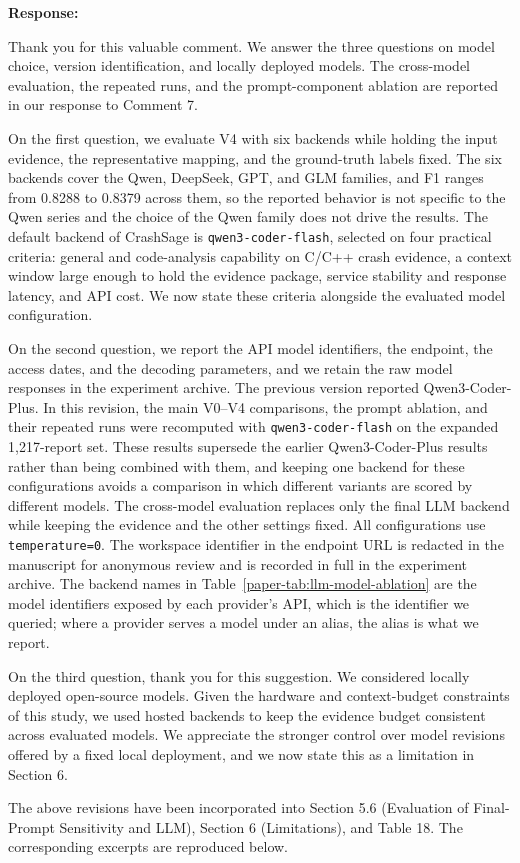 \documentclass[onecolumn,11pt]{article}
\newcommand{\secr}[2]{\par\mySep \noindent \textsf{\textbf{#1 }}{#2}\par}
\newcommand{\mySep}{\vspace{8pt}}
\begin{document}
\secr{Response:}{Thank you for this valuable comment. We answer the three questions on model choice, version identification, and locally deployed models. The cross-model evaluation, the repeated runs, and the prompt-component ablation are reported in our response to Comment 7.

On the first question, we evaluate V4 with six backends while holding the input evidence, the representative mapping, and the ground-truth labels fixed. The six backends cover the Qwen, DeepSeek, GPT, and GLM families, and F1 ranges from 0.8288 to 0.8379 across them, so the reported behavior is not specific to the Qwen series and the choice of the Qwen family does not drive the results. The default backend of CrashSage is \texttt{qwen3-coder-flash}, selected on four practical criteria: general and code-analysis capability on C/C++ crash evidence, a context window large enough to hold the evidence package, service stability and response latency, and API cost. We now state these criteria alongside the evaluated model configuration.

On the second question, we report the API model identifiers, the endpoint, the access dates, and the decoding parameters, and we retain the raw model responses in the experiment archive. The previous version reported Qwen3-Coder-Plus. In this revision, the main V0--V4 comparisons, the prompt ablation, and their repeated runs were recomputed with \texttt{qwen3-coder-flash} on the expanded 1,217-report set. These results supersede the earlier Qwen3-Coder-Plus results rather than being combined with them, and keeping one backend for these configurations avoids a comparison in which different variants are scored by different models. The cross-model evaluation replaces only the final LLM backend while keeping the evidence and the other settings fixed. All configurations use \texttt{temperature=0}. The workspace identifier in the endpoint URL is redacted in the manuscript for anonymous review and is recorded in full in the experiment archive. The backend names in Table~\ref{paper-tab:llm-model-ablation} are the model identifiers exposed by each provider's API, which is the identifier we queried; where a provider serves a model under an alias, the alias is what we report.

On the third question, thank you for this suggestion. We considered locally deployed open-source models. Given the hardware and context-budget constraints of this study, we used hosted backends to keep the evidence budget consistent across evaluated models. We appreciate the stronger control over model revisions offered by a fixed local deployment, and we now state this as a limitation in Section 6.

The above revisions have been incorporated into Section 5.6 (Evaluation of Final-Prompt Sensitivity and LLM), Section 6 (Limitations), and Table 18. The corresponding excerpts are reproduced below.}
\end{document}
